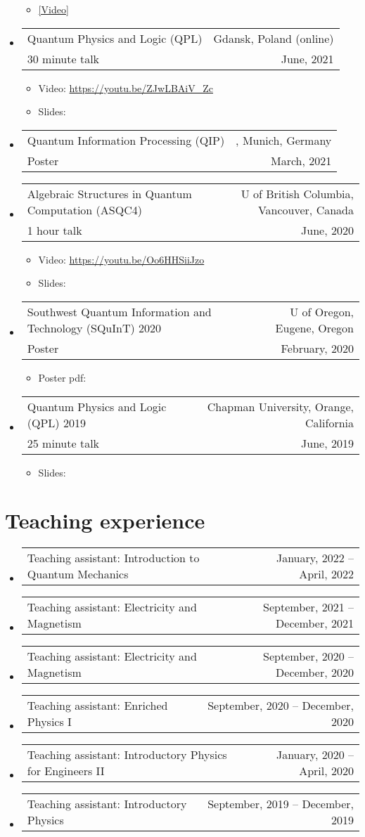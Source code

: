 \documentclass[letterpaper,11pt]{article}
\makeatletter
\newcommand{\ConferenceItem}[4]{
	\item{\vspace{-1pt}
		\begin{tabular*}{0.97\textwidth}{l@{\extracolsep{\fill}}r}
			{#1} & {#2}\\
			{#3} & {#4}
		\end{tabular*}
		\vspace{-5pt}
	}
}
\newcommand{\TeachingItem}[2]{
	\item{\vspace{-1pt}
		\begin{tabular*}{0.92\textwidth}{l@{\extracolsep{\fill}}r}
			{#1} & {#2}
		\end{tabular*}
		\vspace{-5pt}
	}
}
\makeatother
\begin{document}
\begin{itemize}[leftmargin=*]
\begin{itemize}
		\item \href{https://youtu.be/b1wYoOOLZCI}{[Video]}
	\end{itemize}
	\ConferenceItem{Quantum Physics and Logic (QPL)}{Gdansk, Poland (online)}{30 minute talk}{June, 2021}
	\begin{itemize}
		\item Video: \href{https://youtu.be/ZJwLBAiV_Zc}{https://youtu.be/ZJwLBAiV\_Zc}
		\item Slides: \href{}{}
	\end{itemize}
	\ConferenceItem{Quantum Information Processing (QIP)}{, Munich, Germany}{Poster}{March, 2021}
	\ConferenceItem{Algebraic Structures in Quantum Computation (ASQC4)}{U of British Columbia, Vancouver, Canada}{1 hour talk}{June, 2020}
	\begin{itemize}
		\item Video: \href{https://youtu.be/Oo6HHSiiJzo}{https://youtu.be/Oo6HHSiiJzo}
		\item Slides: \href{}{}
	\end{itemize}
	\ConferenceItem{Southwest Quantum Information and Technology (SQuInT) 2020}{U of Oregon, Eugene, Oregon}{Poster}{February, 2020}
	\begin{itemize}
		\item Poster pdf: \href{}{}
	\end{itemize}
	\ConferenceItem{Quantum Physics and Logic (QPL) 2019}{Chapman University, Orange, California}{25 minute talk}{June, 2019}
	\begin{itemize}
		\item Slides: \href{}{}
	\end{itemize}
\end{itemize}

\section*{Teaching experience}
\begin{itemize}[leftmargin=*]
	\TeachingItem{Teaching assistant: Introduction to Quantum Mechanics}{January, 2022 -- April, 2022}
	\TeachingItem{Teaching assistant: Electricity and Magnetism}{September, 2021 -- December, 2021}
	\TeachingItem{Teaching assistant: Electricity and Magnetism}{September, 2020 -- December, 2020}
	\TeachingItem{Teaching assistant: Enriched Physics I}{September, 2020 -- December, 2020}
	\TeachingItem{Teaching assistant: Introductory Physics for Engineers II}{January, 2020 -- April, 2020}
	\TeachingItem{Teaching assistant: Introductory Physics}{September, 2019 -- December, 2019}
\end{itemize}
\end{document}
